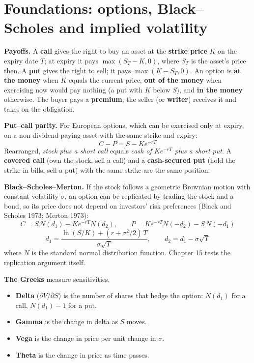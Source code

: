 \section{Foundations: options, Black--Scholes and implied volatility}
\label{sec:14-foundations}

\textbf{Payoffs.} A \textbf{call} gives the right to buy an asset at the \textbf{strike price} $K$ on the expiry date $T$; at expiry it pays $\max(S_T - K, 0)$, where $S_T$ is the asset's price then. A \textbf{put} gives the right to sell; it pays $\max(K - S_T, 0)$. An option is \textbf{at the money} when $K$ equals the current price, \textbf{out of the money} when exercising now would pay nothing (a put with $K$ below $S$), and \textbf{in the money} otherwise. The buyer pays a \textbf{premium}; the seller (or \textbf{writer}) receives it and takes on the obligation.

\textbf{Put--call parity.} For European options, which can be exercised only at expiry, on a non-dividend-paying asset with the same strike and expiry:
\begin{equation}
  C - P = S - K e^{-rT}
  \label{eq:14-parity}
\end{equation}
Rearranged, \emph{stock plus a short call} equals \emph{cash of $Ke^{-rT}$ plus a short put}. A \textbf{covered call} (own the stock, sell a call) and a \textbf{cash-secured put} (hold the strike in bills, sell a put) with the same strike are the same position.

\textbf{Black--Scholes--Merton.} If the stock follows a geometric Brownian motion with constant volatility $\sigma$, an option can be replicated by trading the stock and a bond, so its price does not depend on investors' risk preferences (Black and Scholes 1973; Merton 1973):
\begin{equation}
  C = S\,N(d_1) - K e^{-rT} N(d_2), \qquad P = K e^{-rT} N(-d_2) - S\,N(-d_1)
  \label{eq:14-bs}
\end{equation}
\begin{equation}
  d_1 = \frac{\ln(S/K) + (r + \sigma^2/2)\,T}{\sigma\sqrt{T}}, \qquad d_2 = d_1 - \sigma\sqrt{T}
  \label{eq:14-d}
\end{equation}
where $N$ is the standard normal distribution function. Chapter 15 tests the replication argument itself.

\textbf{The Greeks} measure sensitivities.

\begin{itemize}
  \item \textbf{Delta} ($\partial V/\partial S$) is the number of shares that hedge the option: $N(d_1)$ for a call, $N(d_1) - 1$ for a put.
  \item \textbf{Gamma} is the change in delta as $S$ moves.
  \item \textbf{Vega} is the change in price per unit change in $\sigma$.
  \item \textbf{Theta} is the change in price as time passes.
\end{itemize}


